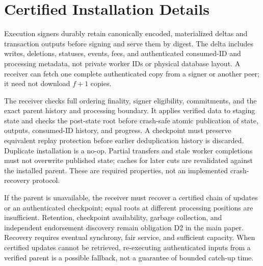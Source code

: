 \section{Certified Installation Details}
\label{app:transfer-details}

Execution signers durably retain canonically encoded, materialized deltas and transaction
outputs before signing and serve them by digest. The delta includes writes,
deletions, statuses, events, fees, and authenticated consumed-ID and processing metadata, not private worker IDs
or physical database layout. A receiver can fetch one complete authenticated copy
from a signer or another peer; it need not download \(f+1\) copies.

The receiver checks full ordering finality, signer eligibility, commitments, and
the exact parent history and processing boundary. It applies verified data to
staging state and checks the post-state root before crash-safe atomic publication
of state, outputs, consumed-ID history, and progress. A checkpoint must preserve
equivalent replay protection before earlier deduplication history is discarded.
Duplicate installation is a no-op. Partial transfers and stale
worker completions must not overwrite published state; caches for later cuts are
revalidated against the installed parent. These are required properties, not an
implemented crash-recovery protocol.

If the parent is unavailable, the receiver must recover a certified chain of
updates or an authenticated checkpoint; equal roots at different processing
positions are insufficient. Retention, checkpoint availability, garbage
collection, and independent endorsement discovery remain obligation D2 in the
main paper. Recovery requires eventual synchrony, fair service, and sufficient
capacity. When certified updates cannot be retrieved, re-executing authenticated
inputs from a verified parent is a possible fallback, not a guarantee of bounded
catch-up time.
